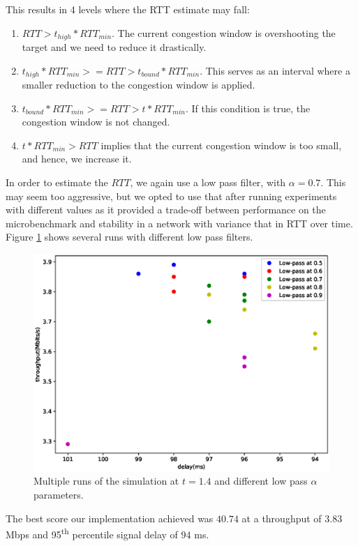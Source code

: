 \documentclass[12pt]{article}
\begin{document}
This results in 4 levels where the RTT estimate may fall:
\begin{enumerate}
\item $RTT > t_{high} * RTT_{min}$. The current congestion window is
overshooting the target and we need to reduce it drastically.
\item $t_{high}*RTT_{min} >= RTT > t_{bound}*RTT_{min}$. This serves as an
interval where a smaller reduction to the congestion window is applied.
\item $t_{bound} *RTT_{min} >= RTT > t * {RTT_{min}}$. If this condition is
true, the congestion window is not changed.
\item $t * RTT_{min} > RTT$ implies that the current congestion window is too
small, and hence, we increase it.
\end{enumerate}

In order to estimate the $RTT$, we again use a low pass filter, with $\alpha =
0.7$. This may seem too aggressive, but we opted to use that after running
experiments with different values as it provided a trade-off between performance
on the microbenchmark and stability in a network with variance that in RTT over
time. Figure \ref{fig:low-pass-1-4} shows several runs with different low pass
filters.

\begin{figure}[h]
\includegraphics[width=\textwidth,height=\textheight,keepaspectratio]{figure_2.eps}
\caption{Multiple runs of the simulation at $t=1.4$ and different low pass
$\alpha$ parameters.}
\label{fig:low-pass-1-4}
\end{figure}

The best score our implementation achieved was $40.74$ at a throughput of $3.83$
Mbps and 95\textsuperscript{th} percentile signal delay of $94$ ms.
\end{document}
